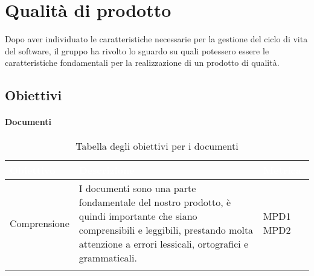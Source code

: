 \chapter{Qualità di prodotto}
Dopo aver individuato le caratteristiche necessarie per la gestione del ciclo di vita del software, il gruppo ha rivolto lo sguardo su quali potessero essere le caratteristiche fondamentali per la realizzazione di un prodotto di qualità.
\section{Obiettivi}
\subsubsection{Documenti}

\begin{center}
  \renewcommand{\arraystretch}{1.25}
  \begin{longtable}{|p{3cm}|p{7.5cm}|p{2cm}|} \hline
  \rowcolor[HTML]{036400}
  \textcolor{white}{\textbf{Obiettivo}} & \textcolor{white}{\textbf{Descrizione}} & \textcolor{white}{\textbf{Metrica}} \\[0.2em] \hline
  \rowcolor[HTML]{EFEFEF}
    Comprensione & I documenti sono una parte fondamentale del nostro prodotto, è quindi importante che siano comprensibili e leggibili, prestando molta attenzione a errori lessicali, ortografici e grammaticali.  & MPD1 \newline MPD2       \\ \hline
    \caption{Tabella degli obiettivi per i documenti}
  \end{longtable}
\end{center}


